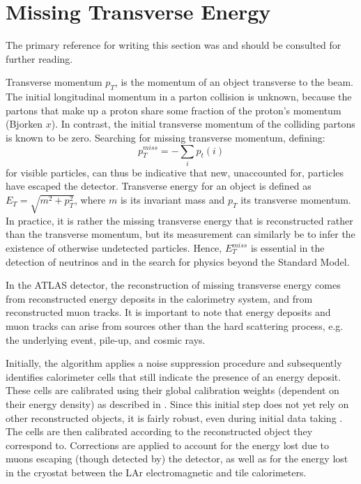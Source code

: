 \section{Missing Transverse Energy}
The primary reference for writing this section was \cite{pizio_thesis} and should be consulted for further reading.

Transverse momentum $p_{T}$, is the momentum of an object transverse to the beam. The initial longitudinal momentum in a parton collision is unknown, because the partons that make up a proton share some fraction of the proton's momentum (Bjorken $x$). In contrast, the initial transverse momentum of the colliding partons is known to be zero. Searching for missing transverse momentum, defining: $$p_{T}^{miss} = - \sum_{i} p_{t}(i)$$ for visible particles, can thus be indicative that new, unaccounted for, particles have escaped the detector. Transverse energy for an object is defined as $E_{T} = \sqrt{m^{2} + p^{2}_{T}}$, where $m$ is its invariant mass and $p_{T}$ its transverse momentum. In practice, it is rather the missing transverse energy that is reconstructed rather than the transverse momentum, but its measurement can similarly be to infer the existence of otherwise  undetected particles. Hence, $E_{T}^{miss}$ is essential in the detection of neutrinos and in the search for physics beyond the Standard Model.

In the ATLAS detector, the reconstruction of missing transverse energy comes from reconstructed energy deposits in the calorimetry system, and from reconstructed muon tracks. It is important to note that energy deposits and muon tracks can arise from sources other than the hard scattering process, e.g. the underlying event, pile-up, and cosmic rays.

Initially, the algorithm applies a noise suppression procedure and subsequently identifies calorimeter cells that still indicate the presence of an energy deposit. These cells are calibrated using their global calibration weights (dependent on their energy density) as described in \cite{ATLAS}. Since this initial step does not yet rely on other reconstructed objects, it is fairly robust, even during initial data taking \cite{pizio_thesis}. The cells are then calibrated according to the reconstructed object they correspond to. Corrections are applied to account for the energy lost due to muons escaping (though detected by) the detector, as well as for the energy lost in the cryostat between the LAr electromagnetic and tile calorimeters.

